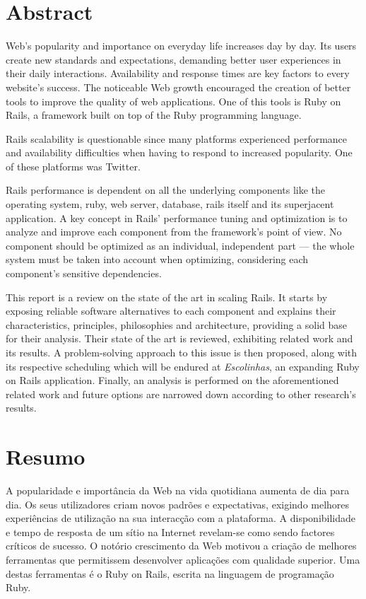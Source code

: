 
\chapter*{Abstract}

Web's popularity and importance on everyday life increases day by day. Its users create new standards and expectations, demanding better user experiences in their daily interactions. Availability and response times are key factors to every website's success. The noticeable Web growth encouraged the creation of better tools to improve the quality of web applications. One of this tools is Ruby on Rails, a framework built on top of the Ruby programming language.

Rails scalability is questionable since many platforms experienced performance and availability difficulties when having to respond to increased popularity. One of these platforms was Twitter. 

Rails performance is dependent on all the underlying components like the operating system, ruby, web server, database, rails itself and its superjacent application. A key concept in Rails' performance tuning and optimization is to analyze and improve each component from the framework's point of view. No component should be optimized as an individual, independent part --- the whole system must be taken into account when optimizing, considering each component's sensitive dependencies.

This report is a review on the state of the art in scaling Rails. It starts by exposing reliable software alternatives to each component and explains their characteristics, principles, philosophies and architecture, providing a solid base for their analysis. Their state of the art is reviewed, exhibiting related work and its results. A problem-solving approach to this issue is then proposed, along with its respective scheduling which will be endured at \textit{Escolinhas}, an expanding Ruby on Rails application. Finally, an analysis is performed on the aforementioned related work and future options are narrowed down according to other research's results.

\chapter*{Resumo}

A popularidade e importância da Web na vida quotidiana aumenta de dia para dia. Os seus utilizadores criam novos padrões e expectativas, exigindo melhores experiências de utilização na sua interacção com a plataforma. A disponibilidade e tempo de resposta de um sítio na Internet revelam-se como sendo factores críticos de sucesso. O notório crescimento da Web motivou a criação de melhores ferramentas que permitissem desenvolver aplicações com qualidade superior. Uma destas ferramentas é o Ruby on Rails, escrita na linguagem de programação Ruby.

